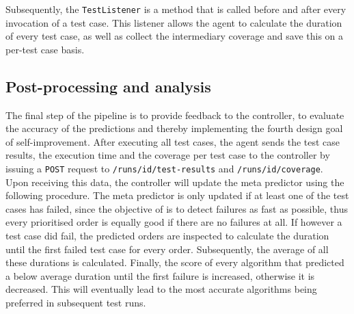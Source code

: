 \noindent Subsequently, the \texttt{TestListener} is a method that is called before and after every invocation of a test case. This listener allows the agent to calculate the duration of every test case, as well as collect the intermediary coverage and save this on a per-test case basis.

\subsection{Post-processing and analysis}\label{ssec:pipeline-postanalysis}
The final step of the pipeline is to provide feedback to the controller, to evaluate the accuracy of the predictions and thereby implementing the fourth design goal of self-improvement. After executing all test cases, the agent sends the test case results, the execution time and the coverage per test case to the controller by issuing a \texttt{POST} request to \texttt{/runs/id/test-results} and \texttt{/runs/id/coverage}.\\

\noindent Upon receiving this data, the controller will update the meta predictor using the following procedure. The meta predictor is only updated if at least one of the test cases has failed, since the objective of \tcp{} is to detect failures as fast as possible, thus every prioritised order is equally good if there are no failures at all. If however a test case did fail, the predicted orders are inspected to calculate the duration until the first failed test case for every order. Subsequently, the average of all these durations is calculated. Finally, the score of every algorithm that predicted a below average duration until the first failure is increased, otherwise it is decreased. This will eventually lead to the most accurate algorithms being preferred in subsequent test runs.